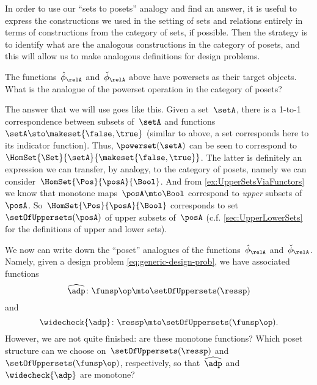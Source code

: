 In order to use our ``sets to posets'' analogy and find an answer, it is useful to express the constructions we used in the setting of sets and relations entirely in terms of constructions from the category of sets, if possible.
Then the strategy is to identify what are the analogous constructions in the category of posets, and this will allow us to make analogous definitions for design problems.

The functions~$\hat \phi_{\relA}$ and~$\check \phi_{\relA}$ above have powersets as their target objects.
What is the analogue of the powerset operation in the category of posets?

The answer that we will use goes like this.
Given a set~$\setA$, there is a 1-to-1 correspondence between subsets of~$\setA$ and functions~$\setA \sto \makeset{ \false, \true }$ (similar to above, a set corresponds here to its indicator function).
Thus, $\powerset (\setA)$ can be seen to correspond to~$\HomSet{\Set}{\setA}{\makeset{ \false, \true}}$.
The latter is definitely an expression we can transfer, by analogy, to the category of posets, namely we can consider~$\HomSet{\Pos}{\posA}{\Bool}$.
And from \cref{ex:UpperSetsViaFunctors} we know that monotone maps~$\posA \mto \Bool$ correspond to \emph{upper} subsets of~$\posA$.
So~$\HomSet{\Pos}{\posA}{\Bool}$ corresponds to set~$\setOfUppersets (\posA)$ of upper subsets of~$\posA$ (c.f.
\cref{sec:UpperLowerSets} for the definitions of upper and lower sets).

We now can write down the ``poset'' analogues of the functions~$\hat \phi_{\relA}$ and~$\check \phi_{\relA}$.
Namely, given a design problem \cref{eq:generic-design-prob}, we have associated functions
\begin{equation}
    \label{eq:dp-left-curry}
    \widehat{\adp} \colon \funsp\op \mto \setOfUppersets (\ressp)
\end{equation}
and
\begin{equation}
    \label{eq:dp-right-curry}
    \widecheck{\adp} \colon \ressp \mto \setOfUppersets (\funsp\op).
\end{equation}
However, we are not quite finished: are these monotone functions?
Which poset structure can we choose on~$\setOfUppersets (\ressp)$ and~$\setOfUppersets (\funsp\op)$, respectively, so that~$\widehat{\adp}$ and~$\widecheck{\adp}$ are monotone?

